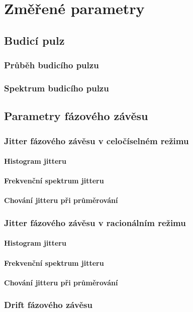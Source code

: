 \chapter{Změřené parametry}

\section{Budicí pulz}

\subsection{Průběh budicího pulzu}

\subsection{Spektrum budicího pulzu}

\section{Parametry fázového závěsu}

\subsection{Jitter fázového závěsu v celočíselném režimu}

\subsubsection{Histogram jitteru}

\subsubsection{Frekvenční spektrum jitteru}

\subsubsection{Chování jitteru při průměrování}

\subsection{Jitter fázového závěsu v racionálním režimu}

\subsubsection{Histogram jitteru}

\subsubsection{Frekvenční spektrum jitteru}

\subsubsection{Chování jitteru při průměrování}

\subsection{Drift fázového závěsu}




